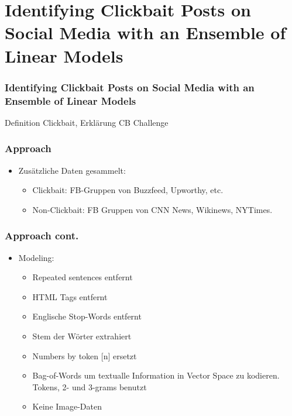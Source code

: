 \documentclass{beamer}
\begin{document}
\section{Identifying Clickbait Posts on Social Media with an Ensemble of Linear Models}
\begin{frame}
	\frametitle{Identifying Clickbait Posts on Social Media with an Ensemble of Linear Models}
	\begin{definition}
	Definition Clickbait, Erklärung CB Challenge
	\end{definition}
\end{frame}
\begin{frame}
	\frametitle{Approach}
        \begin{itemize}
		\item Zusätzliche Daten gesammelt:
		    \begin{itemize}
			\item Clickbait: FB-Gruppen von Buzzfeed, Upworthy, etc.
			\item Non-Clickbait: FB Gruppen von CNN News, Wikinews, NYTimes.
			\end{itemize}
    	\end{itemize}
\end{frame}
\begin{frame}
	\frametitle{Approach cont.}
        \begin{itemize}
		\item Modeling:
		    \begin{itemize}
    		\item Repeated sentences entfernt
			\item HTML Tags entfernt
			\item Englische Stop-Words entfernt
			\item Stem der Wörter extrahiert
			\item Numbers by token [n] ersetzt
			\item Bag-of-Words um textualle Information in Vector Space zu kodieren. Tokens, 2- und 3-grams benutzt
			\item Keine Image-Daten
			\end{itemize}
		\end{itemize}
\end{frame}
\end{document}
